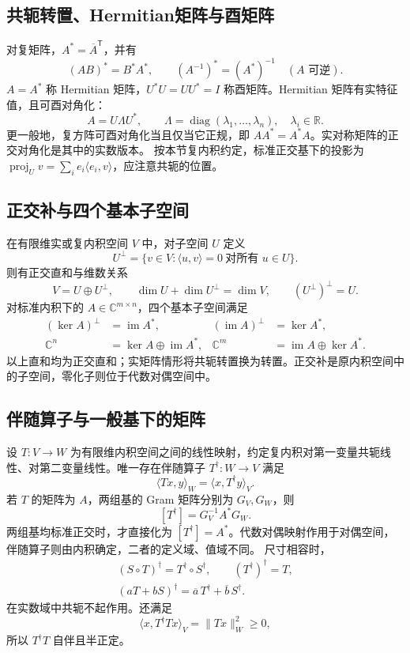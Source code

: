 \documentclass[../main.tex]{subfiles}
\begin{document}
\subsection{共轭转置、Hermitian矩阵与酉矩阵}
对复矩阵，$A^*=\overline A^{\mathsf T}$，并有
\[
(AB)^*=B^*A^*,\qquad (A^{-1})^*=(A^*)^{-1}\quad(A\text{ 可逆}).
\]
$A=A^*$ 称 Hermitian 矩阵，$U^*U=UU^*=I$ 称酉矩阵。Hermitian 矩阵有实特征值，且可酉对角化：
\[
A=U\Lambda U^*,\qquad
\Lambda=\operatorname{diag}(\lambda_1,\ldots,\lambda_n),\quad\lambda_i\in\mathbb R.
\]
更一般地，复方阵可酉对角化当且仅当它正规，即 $AA^*=A^*A$。实对称矩阵的正交对角化是其中的实数版本。
按本节复内积约定，标准正交基下的投影为 $\operatorname{proj}_U v=\sum_i e_i\langle e_i,v\rangle$，应注意共轭的位置。
\subsection{正交补与四个基本子空间}
在有限维实或复内积空间 $V$ 中，对子空间 $U$ 定义
\[
U^\perp=\{v\in V:\langle u,v\rangle=0\ \text{对所有 }u\in U\}.
\]
则有正交直和与维数关系
\[
V=U\oplus U^\perp,\qquad
\dim U+\dim U^\perp=\dim V,\qquad (U^\perp)^\perp=U.
\]
对标准内积下的 $A\in\mathbb C^{m\times n}$，四个基本子空间满足
\begin{align*}
(\ker A)^\perp&=\operatorname{im}A^*, &
(\operatorname{im}A)^\perp&=\ker A^*,\\
\mathbb C^n&=\ker A\oplus\operatorname{im}A^*, &
\mathbb C^m&=\operatorname{im}A\oplus\ker A^*.
\end{align*}
以上直和均为正交直和；实矩阵情形将共轭转置换为转置。正交补是原内积空间中的子空间，零化子则位于代数对偶空间中。
\subsection{伴随算子与一般基下的矩阵}
设 $T:V\to W$ 为有限维内积空间之间的线性映射，约定复内积对第一变量共轭线性、对第二变量线性。唯一存在伴随算子 $T^\dagger:W\to V$ 满足
\[
\langle Tx,y\rangle_W=\langle x,T^\dagger y\rangle_V.
\]
若 $T$ 的矩阵为 $A$，两组基的 Gram 矩阵分别为 $G_V,G_W$，则
\[
[T^\dagger]=G_V^{-1}A^*G_W.
\]
两组基均标准正交时，才直接化为 $[T^\dagger]=A^*$。代数对偶映射作用于对偶空间，伴随算子则由内积确定，二者的定义域、值域不同。
尺寸相容时，
\begin{gather*}
(S\circ T)^\dagger=T^\dagger\circ S^\dagger,\qquad
(T^\dagger)^\dagger=T,\\
(aT+bS)^\dagger=\overline a\,T^\dagger+\overline b\,S^\dagger.
\end{gather*}
在实数域中共轭不起作用。还满足
\[
\langle x,T^\dagger Tx\rangle_V=\|Tx\|_W^2\ge0,
\]
所以 $T^\dagger T$ 自伴且半正定。
\end{document}

